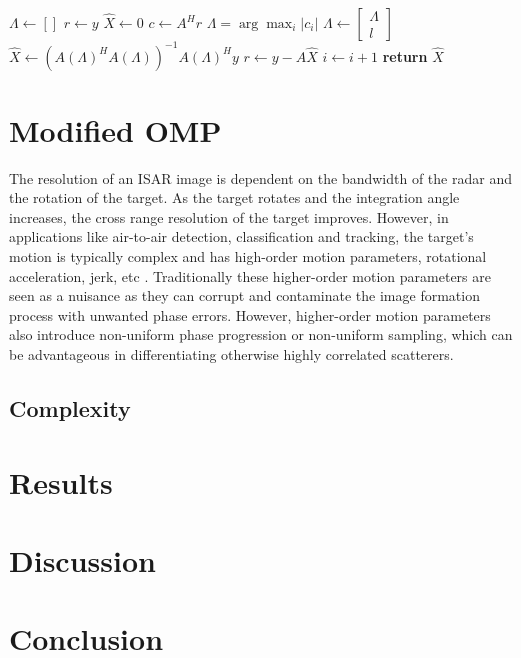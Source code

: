 \documentclass[]{spie}  %
\begin{document}
\begin{algorithm}[H]
\caption{Orthogonal Matching Pursuit}\label{algo:OMP}
\begin{algorithmic}[1]
\State $\Lambda\gets []$
\State $r \gets y$
\State $\hat{X} \gets 0$
\State $c\gets A^{H}r$
\State $\Lambda = \arg\max_{i} \big| c_i \big|$
\State $\Lambda \gets \begin{bmatrix} \Lambda \\ l \end{bmatrix}$
\State $\hat{X} \gets (A(\Lambda)^{H}A(\Lambda))^{-1}A(\Lambda)^{H}y$
\State $r \gets y - A\hat{X}$
\State $i \gets i + 1$
\EndFor
\State \textbf{return} $\hat{X}$
\EndProcedure
\end{algorithmic}
\end{algorithm}

\section{Modified OMP}

The resolution of an ISAR image is dependent on the bandwidth of the radar and the rotation of the target. As the target rotates and the integration angle increases, the cross range resolution of the target improves. However, in applications like air-to-air detection, classification and tracking, the target's motion is typically complex and has high-order motion parameters, rotational acceleration, jerk, etc \cite{Liu_2012}. Traditionally these higher-order motion parameters are seen as a nuisance as they can corrupt and contaminate the image formation process with unwanted phase errors. However, higher-order motion parameters also introduce non-uniform phase progression or non-uniform sampling, which can be advantageous in differentiating otherwise highly correlated scatterers.

\subsection{Complexity}

\section{Results}



\section{Discussion}

\section{Conclusion}

\end{document}
